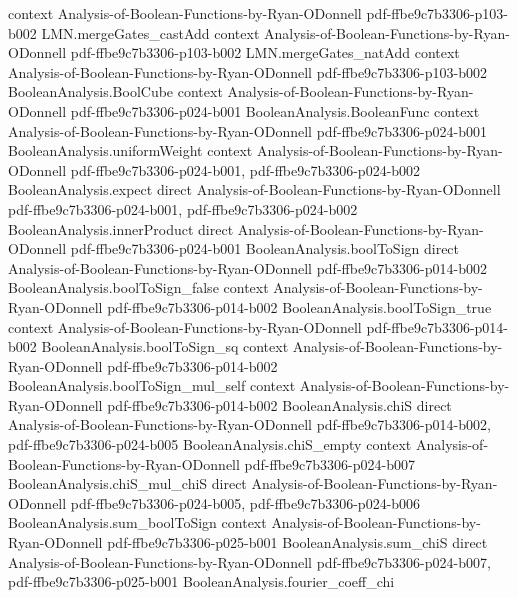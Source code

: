 \begin{lemma}
  {context}
  {Analysis-of-Boolean-Functions-by-Ryan-ODonnell}
  {pdf-ffbe9c7b3306-p103-b002}
\proofstep
  {LMN.mergeGates_castAdd}
  {context}
  {Analysis-of-Boolean-Functions-by-Ryan-ODonnell}
  {pdf-ffbe9c7b3306-p103-b002}
\proofstep
  {LMN.mergeGates_natAdd}
  {context}
  {Analysis-of-Boolean-Functions-by-Ryan-ODonnell}
  {pdf-ffbe9c7b3306-p103-b002}
\proofstep
  {BooleanAnalysis.BoolCube}
  {context}
  {Analysis-of-Boolean-Functions-by-Ryan-ODonnell}
  {pdf-ffbe9c7b3306-p024-b001}
\proofstep
  {BooleanAnalysis.BooleanFunc}
  {context}
  {Analysis-of-Boolean-Functions-by-Ryan-ODonnell}
  {pdf-ffbe9c7b3306-p024-b001}
\proofstep
  {BooleanAnalysis.uniformWeight}
  {context}
  {Analysis-of-Boolean-Functions-by-Ryan-ODonnell}
  {pdf-ffbe9c7b3306-p024-b001,
    pdf-ffbe9c7b3306-p024-b002}
\proofstep
  {BooleanAnalysis.expect}
  {direct}
  {Analysis-of-Boolean-Functions-by-Ryan-ODonnell}
  {pdf-ffbe9c7b3306-p024-b001,
    pdf-ffbe9c7b3306-p024-b002}
\proofstep
  {BooleanAnalysis.innerProduct}
  {direct}
  {Analysis-of-Boolean-Functions-by-Ryan-ODonnell}
  {pdf-ffbe9c7b3306-p024-b001}
\proofstep
  {BooleanAnalysis.boolToSign}
  {direct}
  {Analysis-of-Boolean-Functions-by-Ryan-ODonnell}
  {pdf-ffbe9c7b3306-p014-b002}
\proofstep
  {BooleanAnalysis.boolToSign_false}
  {context}
  {Analysis-of-Boolean-Functions-by-Ryan-ODonnell}
  {pdf-ffbe9c7b3306-p014-b002}
\proofstep
  {BooleanAnalysis.boolToSign_true}
  {context}
  {Analysis-of-Boolean-Functions-by-Ryan-ODonnell}
  {pdf-ffbe9c7b3306-p014-b002}
\proofstep
  {BooleanAnalysis.boolToSign_sq}
  {context}
  {Analysis-of-Boolean-Functions-by-Ryan-ODonnell}
  {pdf-ffbe9c7b3306-p014-b002}
\proofstep
  {BooleanAnalysis.boolToSign_mul_self}
  {context}
  {Analysis-of-Boolean-Functions-by-Ryan-ODonnell}
  {pdf-ffbe9c7b3306-p014-b002}
\proofstep
  {BooleanAnalysis.chiS}
  {direct}
  {Analysis-of-Boolean-Functions-by-Ryan-ODonnell}
  {pdf-ffbe9c7b3306-p014-b002,
    pdf-ffbe9c7b3306-p024-b005}
\proofstep
  {BooleanAnalysis.chiS_empty}
  {context}
  {Analysis-of-Boolean-Functions-by-Ryan-ODonnell}
  {pdf-ffbe9c7b3306-p024-b007}
\proofstep
  {BooleanAnalysis.chiS_mul_chiS}
  {direct}
  {Analysis-of-Boolean-Functions-by-Ryan-ODonnell}
  {pdf-ffbe9c7b3306-p024-b005,
    pdf-ffbe9c7b3306-p024-b006}
\proofstep
  {BooleanAnalysis.sum_boolToSign}
  {context}
  {Analysis-of-Boolean-Functions-by-Ryan-ODonnell}
  {pdf-ffbe9c7b3306-p025-b001}
\proofstep
  {BooleanAnalysis.sum_chiS}
  {direct}
  {Analysis-of-Boolean-Functions-by-Ryan-ODonnell}
  {pdf-ffbe9c7b3306-p024-b007,
    pdf-ffbe9c7b3306-p025-b001}
\proofstep
  {BooleanAnalysis.fourier_coeff_chi}

\end{lemma}
